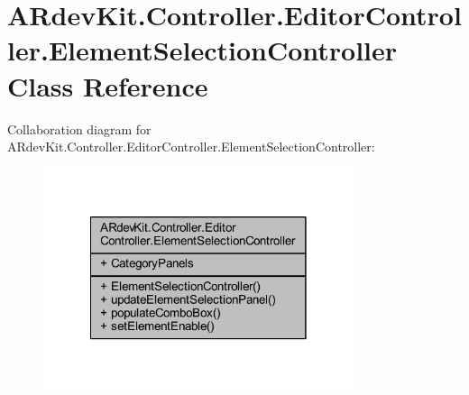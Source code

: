 \hypertarget{class_a_rdev_kit_1_1_controller_1_1_editor_controller_1_1_element_selection_controller}{\section{A\-Rdev\-Kit.\-Controller.\-Editor\-Controller.\-Element\-Selection\-Controller Class Reference}
\label{class_a_rdev_kit_1_1_controller_1_1_editor_controller_1_1_element_selection_controller}
}


Collaboration diagram for A\-Rdev\-Kit.\-Controller.\-Editor\-Controller.\-Element\-Selection\-Controller\-:
\nopagebreak
\begin{figure}[H]
\begin{center}
\leavevmode
\includegraphics[width=258pt]{class_a_rdev_kit_1_1_controller_1_1_editor_controller_1_1_element_selection_controller__coll__graph}
\end{center}
\end{figure}
